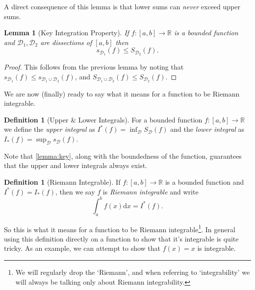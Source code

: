 \documentclass[11pt, a4paper]{article}
\newtheorem{lemma}[theorem]{Lemma}
\theoremstyle{definition}
\newtheorem{definition}[theorem]{Definition}
\newcommand{\vocab}[1]{\emph{#1}} %
\newcommand{\R}{\mathbb{R}}
\newcommand{\DD}{\mathcal{D}}
\newcommand{\dd}{\mathrm{d}}
\begin{document}
A direct consequence of this lemma is that lower sums can \emph{never} exceed upper sums.

\begin{lemma}[Key Integration Property]\label{lemma:key}
	If $f: [a, b] \rightarrow \R$ is a bounded function and $\DD_1, \DD_2$ are dissections of $[a, b]$ then
	$$
s_{\DD_1}(f) \leq S_{\DD_2}(f).
	$$
\end{lemma}
\begin{proof}
	This follows from the previous lemma by noting that $s_{\DD_1}(f) \leq s_{\DD_1 \cup \DD_2}(f)$, and $S_{\DD_1 \cup \DD_2}(f) \leq S_{\DD_2} (f)$.
\end{proof}

We are now (finally) ready to say what it means for a function to be Riemann integrable.

\begin{definition}[Upper \& Lower Integrals]
	For a bounded function $f:[a, b] \rightarrow \R$ we define the \vocab{upper integral} as $I^*(f) = \inf_{\DD} S_\DD(f)$ and the \vocab{lower integral} as $I_*(f) = \sup_{\DD} s_\DD(f)$. 
\end{definition}

Note that \autoref{lemma:key}, along with the boundedness of the function, guarantees that the upper and lower integrals always exist.

\begin{definition}[Riemann Integrable]
	If $f:[a, b] \rightarrow \R$ is a bounded function and $I^*(f) = I_*(f)$, then we say $f$ is \vocab{Riemann integrable} and write
	$$
	\int_a^b f(x)\dd x = I^*(f).
	$$
\end{definition}

So this is what it means for a function to be Riemann integrable\footnote{We will regularly drop the `Riemann', and when referring to `integrability' we will always be talking only about Riemann integrability.}. In general using this definition directly on a function to show that it's integrable is quite tricky. As an example, we can attempt to show that $f(x) = x$ is integrable.
\end{document}
